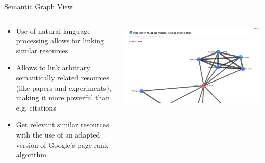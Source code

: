 \documentclass[t,aspectratio=169]{beamer}
\begin{document}
\begin{frame}{Semantic Graph View}
	\begin{columns}[T]
		\begin{column}{.38\textwidth}
            \begin{itemize}
                \item Use of natural language processing allows for linking similar resources
                \item Allows to link arbitrary semantically related resources (like papers and experiments), making it more powerful than e.g. citations
                \item Get relevant similar resources with the use of an adapted version of Google's page rank algorithm
            \end{itemize} %
        \end{column}
		\begin{column}{.58\textwidth}
            \includegraphics[width=\textwidth]{images/3_relevant_work.png}
        \end{column}
    \end{columns}
\end{frame}
\end{document}
